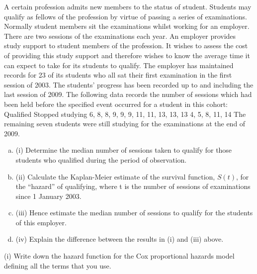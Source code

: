 \documentclass[a4paper,12pt]{article}
\begin{document}
A certain profession admits new members to the status of student. Students may qualify as fellows of the profession by virtue of passing a series of examinations.
Normally student members sit the examinations whilst working for an employer. There are two sessions of the examinations each year.
An employer provides study support to student members of the profession. It wishes to assess the cost of providing this study support and therefore wishes to know the average time it can expect to take for its students to qualify.
The employer has maintained records for 23 of its students who all sat their first examination in the first session of 2003. The students’ progress has been recorded up to and including the last session of 2009. The following data records the number of sessions which had been held before the specified event occurred for a student in this
cohort:
Qualified
Stopped studying
6, 8, 8, 9, 9, 9, 11, 11, 13, 13, 13
4, 5, 8, 11, 14
The remaining seven students were still studying for the examinations at the end of 2009.
\begin{enumerate}[(a)]
\item (i) Determine the median number of sessions taken to qualify for those students who qualified during the period of observation.
\item  
(ii) Calculate the Kaplan-Meier estimate of the survival function, $S(t)$, for the “hazard” of qualifying, where t is the number of sessions of examinations
since 1 January 2003.
\item  
(iii) Hence estimate the median number of sessions to qualify for the students of this employer.
\item  
(iv) Explain the difference between the results in (i) and (iii) above.
\end{enumerate}
(i)
Write down the hazard function for the Cox proportional hazards model defining all the terms that you use.
 
\end{document}
